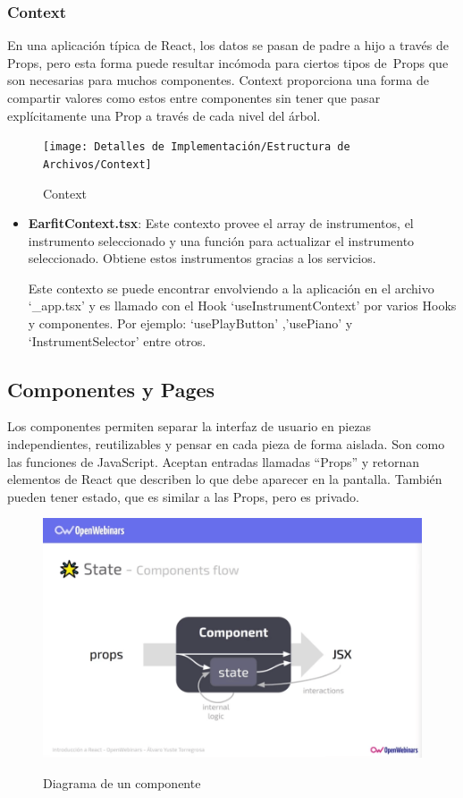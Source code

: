 \documentclass[12pt,twoside,titlepage]{report}
\begin{document}
\subsubsection{Context}

En una aplicación típica de React, los datos se pasan de padre a hijo a través de Props, pero esta forma puede resultar incómoda para ciertos tipos de Props que son necesarias para muchos componentes. Context proporciona una forma de compartir valores como estos entre componentes sin tener que pasar explícitamente una Prop a través de cada nivel del árbol.

\begin{figure}[H]
    \centering
    \texttt{[image: Detalles de Implementación/Estructura de Archivos/Context]}
    \label{fig:Context}
    \caption{Context}
\end{figure}

\begin{itemize}
    \item \textbf{EarfitContext.tsx}: Este contexto provee el array de instrumentos, el instrumento seleccionado y una función para actualizar el instrumento seleccionado. Obtiene estos instrumentos gracias a los servicios.
        
    Este contexto se puede encontrar envolviendo a la aplicación en el archivo ‘\_app.tsx’ y es llamado con el Hook ‘useInstrumentContext’ por varios Hooks y componentes. Por ejemplo: ‘usePlayButton’ ,’usePiano’ y ‘InstrumentSelector’ entre otros.
\end{itemize}

\subsection{Componentes y Pages}

Los componentes permiten separar la interfaz de usuario en piezas independientes, reutilizables y pensar en cada pieza de forma aislada. Son como las funciones de JavaScript. Aceptan entradas llamadas “Props” y retornan elementos de React que describen lo que debe aparecer en la pantalla. También pueden tener estado, que es similar a las Props, pero es privado.

\begin{figure}[H]
    \centering
    \includegraphics[scale=0.3]{Reactjs/ReactComponent}
    \label{fig:ReactComponent}
    \caption{Diagrama de un componente}
\end{figure}
\end{document}
